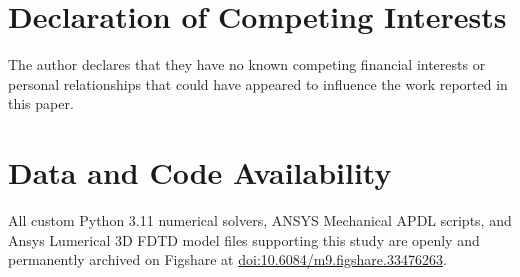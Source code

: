 \documentclass[aps,prd,reprint,superscriptaddress,nofootinbib,floatfix]{revtex4-2}
\begin{document}
\vspace{-4pt}
\section*{Declaration of Competing Interests}
\vspace{-2pt}
The author declares that they have no known competing financial interests or personal relationships that could have appeared to influence the work reported in this paper.

\vspace{-4pt}
\section*{Data and Code Availability}
\vspace{-2pt}
All custom Python 3.11 numerical solvers, ANSYS Mechanical APDL scripts, and Ansys Lumerical 3D FDTD model files supporting this study are openly and permanently archived on Figshare at \href{https://doi.org/10.6084/m9.figshare.33476263}{doi:10.6084/m9.figshare.33476263}.
\end{document}
